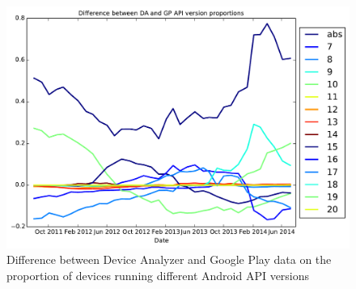\documentclass[conference,a4paper,twoside]{IEEEtran}
\begin{document}
\begin{figure}
 \centering
 \includegraphics[width=\columnwidth]{figures/api_gpcomp_diff}
 \caption{Difference between Device Analyzer and Google Play data on the proportion of devices running different Android API versions}
 \label{fig:da_gp_comp_diff}
\end{figure}
\end{document}
